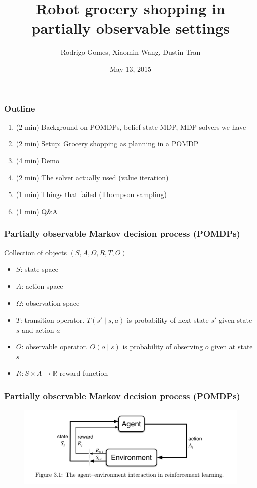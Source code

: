 \documentclass[10pt, compress]{beamer}
\title{Robot grocery shopping in partially observable settings}
\subtitle{}
\date{May 13, 2015}
\author{Rodrigo Gomes, Xiaomin Wang, Dustin Tran}
\institute{MIT, 6.834j Cognitive Robotics}
\begin{document}
\maketitle

\begin{frame}[fragile]
  \frametitle{Outline}

  \begin{enumerate}
  \item (2 min) Background on POMDPs, belief-state MDP, MDP solvers we have
  \item (2 min) Setup: Grocery shopping as planning in a POMDP
  \item (4 min) Demo
  \item (2 min) The solver actually used (value iteration)
  \item (1 min) Things that failed (Thompson sampling)
  \item (1 min) Q\&A
  \end{enumerate}
\end{frame}

\begin{frame}[fragile]
  \frametitle{Partially observable Markov decision process (POMDPs)}

  Collection of objects $(S,A,\Omega,R,T,O)$

  \begin{itemize}
  \item $S$: state space
  \item $A$: action space
  \item $\Omega$: observation space
  \item $T$: transition operator. $T(s' \mid s,a)$ is probability of next state $s'$ given state $s$ and action $a$
  \item $O$: observable operator. $O(o \mid s)$ is probability of observing
  $o$ given at state $s$
  \item $R: S \times A \rightarrow \mathbb{R}$ reward function
  \end{itemize}
\end{frame}

\begin{frame}[fragile]
  \frametitle{Partially observable Markov decision process (POMDPs)}

  \begin{figure}[ht]
  \begin{center}
  \centerline{\includegraphics[width=1.5\textwidth]{img/agent_environment.png}}
  \end{center}
  \end{figure}
\end{frame}
\end{document}
